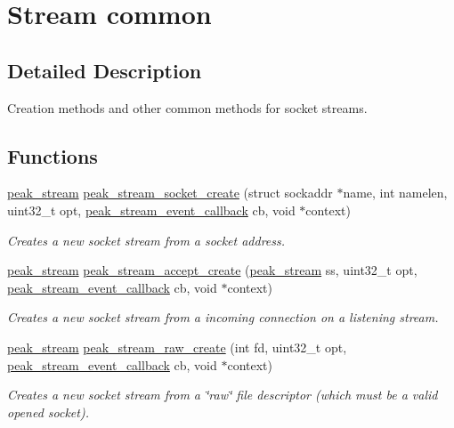 \hypertarget{group__stream__common}{
\section{Stream common}
\label{group__stream__common}
}


\subsection{Detailed Description}
Creation methods and other common methods for socket streams. 



\subsection*{Functions}
\begin{CompactItemize}
\item 
\hyperlink{group__stream_ga0}{peak\_\-stream} \hyperlink{group__stream__common_ga0}{peak\_\-stream\_\-socket\_\-create} (struct sockaddr $\ast$name, int namelen, uint32\_\-t opt, \hyperlink{group__stream_ga1}{peak\_\-stream\_\-event\_\-callback} cb, void $\ast$context)
\begin{CompactList}\small\item\em Creates a new socket stream from a socket address. \item\end{CompactList}\item 
\hyperlink{group__stream_ga0}{peak\_\-stream} \hyperlink{group__stream__common_ga1}{peak\_\-stream\_\-accept\_\-create} (\hyperlink{group__stream_ga0}{peak\_\-stream} ss, uint32\_\-t opt, \hyperlink{group__stream_ga1}{peak\_\-stream\_\-event\_\-callback} cb, void $\ast$context)
\begin{CompactList}\small\item\em Creates a new socket stream from a incoming connection on a listening stream. \item\end{CompactList}\item 
\hyperlink{group__stream_ga0}{peak\_\-stream} \hyperlink{group__stream__common_ga2}{peak\_\-stream\_\-raw\_\-create} (int fd, uint32\_\-t opt, \hyperlink{group__stream_ga1}{peak\_\-stream\_\-event\_\-callback} cb, void $\ast$context)
\begin{CompactList}\small\item\em Creates a new socket stream from a \char`\"{}raw\char`\"{} file descriptor (which must be a valid opened socket). \item\end{CompactList}\item 

\end{CompactItemize}
